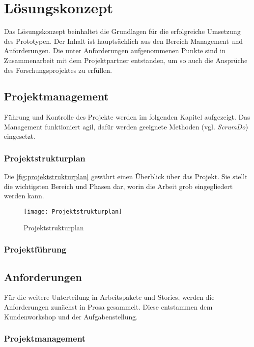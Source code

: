 \chapter{Lösungskonzept}

Das Lösungskonzept beinhaltet die Grundlagen für die erfolgreiche Umsetzung des Prototypen. Der Inhalt ist hauptsächlich aus den Bereich Management und Anforderungen. Die unter Anforderungen aufgenommenen Punkte sind in Zusammenarbeit mit dem Projektpartner entstanden, um so auch die Ansprüche des Forschungsprojektes zu erfüllen.

\section{Projektmanagement}

Führung und Kontrolle des Projekte werden im folgenden Kapitel aufgezeigt. Das Management funktioniert agil, dafür werden geeignete Methoden (vgl. \textit{ScrumDo}) eingesetzt.

\subsection{Projektstrukturplan}
Die \autoref{fig:projektstrukturplan} gewährt einen Überblick über das Projekt. Sie stellt die wichtigsten Bereich und Phasen dar, worin die Arbeit grob eingegliedert werden kann.

\begin{figure}[ht]
\centering
\texttt{[image: Projektstrukturplan]}
\caption{Projektstrukturplan}
\label{fig:projektstrukturplan}
\end{figure}


\subsection{Projektführung}



\section{Anforderungen}

Für die weitere Unterteilung in Arbeitspakete und Stories, werden die Anforderungen zunächst in Prosa gesammelt. Diese entstammen dem Kundenworkshop und der Aufgabenstellung.

\subsection{Projektmanagement}

